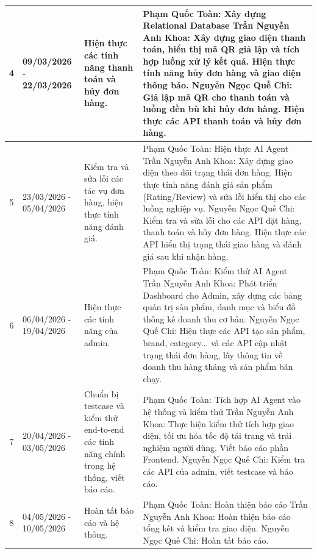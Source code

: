 \begin{longtable}{|c|p{2cm}|p{3.5cm}|p{6cm}|}
4 & 09/03/2026 - 22/03/2026 & Hiện thực các tính năng thanh toán và hủy đơn hàng. &
Phạm Quốc Toàn: Xây dựng Relational Database\newline
Trần Nguyễn Anh Khoa: Xây dựng giao diện thanh toán, hiển thị mã QR giả lập và tích hợp luồng xử lý kết quả. Hiện thực tính năng hủy đơn hàng và giao diện thông báo. \newline
Nguyễn Ngọc Quế Chi: Giả lập mã QR cho thanh toán và luồng đền bù khi hủy đơn hàng. Hiện thực các API thanh toán và hủy đơn hàng. \\ \hline

5 & 23/03/2026 - 05/04/2026 & Kiểm tra và sửa lỗi các tác vụ đơn hàng, hiện thực tính năng đánh giá. &
Phạm Quốc Toàn: Hiện thực AI Agent\newline
Trần Nguyễn Anh Khoa: Xây dựng giao diện theo dõi trạng thái đơn hàng. Hiện thực tính năng đánh giá sản phẩm (Rating/Review) và sửa lỗi hiển thị cho các luồng nghiệp vụ. \newline
Nguyễn Ngọc Quế Chi: Kiểm tra và sửa lỗi cho các API đặt hàng, thanh toán và hủy đơn hàng. Hiện thực các API hiển thị trạng thái giao hàng và đánh giá sau khi nhận hàng. \\ \hline

6 & 06/04/2026 - 19/04/2026 & Hiện thực các tính năng của admin. &
Phạm Quốc Toàn: Kiểm thử AI Agent\newline
Trần Nguyễn Anh Khoa: Phát triển Dashboard cho Admin, xây dựng các bảng quản trị sản phẩm, danh mục và biểu đồ thống kê doanh thu cơ bản. \newline
Nguyễn Ngọc Quế Chi: Hiện thực các API tạo sản phẩm, brand, category... và các API cập nhật trạng thái đơn hàng, lấy thông tin về doanh thu hàng tháng và sản phẩm bán chạy. \\ \hline

7 & 20/04/2026 - 03/05/2026 & Chuẩn bị testcase và kiểm thử end-to-end các tính năng chính trong hệ thống, viết báo cáo. &
Phạm Quốc Toàn: Tích hợp AI Agent vào hệ thống và kiểm thử\newline
Trần Nguyễn Anh Khoa: Thực hiện kiểm thử tích hợp giao diện, tối ưu hóa tốc độ tải trang và trải nghiệm người dùng. Viết báo cáo phần Frontend. \newline
Nguyễn Ngọc Quế Chi: Kiểm tra các API của admin, viết testcase và báo cáo. \\ \hline

8 & 04/05/2026 - 10/05/2026 & Hoàn tất báo cáo và hệ thống. &
Phạm Quốc Toàn: Hoàn thiện báo cáo\newline
Trần Nguyễn Anh Khoa: Hoàn thiện báo cáo tổng kết và kiểm tra giao diện. \newline
Nguyễn Ngọc Quế Chi: Hoàn tất báo cáo. \\ \hline

\end{longtable}